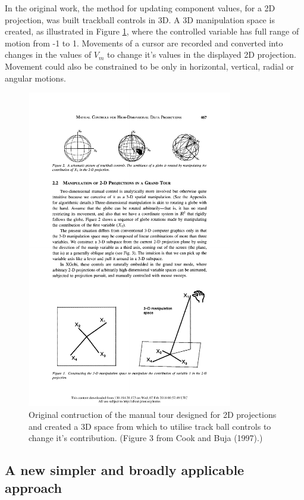 \documentclass[]{interact}
\theoremstyle{plain}%
\theoremstyle{definition}
\theoremstyle{remark}
\begin{document}
In the original work, the method for updating component values, for a 2D
projection, was built trackball controls in 3D. A 3D manipulation space
is created, as illustrated in Figure \ref{manipspace}, where the
controlled variable has full range of motion from -1 to 1. Movements of
a cursor are recorded and converted into changes in the values of
\(V_m\) to change it's values in the displayed 2D projection. Movement
could also be constrained to be only in horizontal, vertical, radial or
angular motions.

\begin{figure}[ht]
\centerline{\includegraphics[width=0.8\textwidth]{figures/manip_space.pdf}}
\caption{Original contruction of the manual tour designed for 2D projections and created a 3D space from which to utilise track ball controls to change it's contribution. (Figure 3 from Cook and Buja (1997).)}
\label{manipspace}
\end{figure}

\hypertarget{a-new-simpler-and-broadly-applicable-approach}{%
\subsection{A new simpler and broadly applicable
approach}\label{a-new-simpler-and-broadly-applicable-approach}}
\end{document}
